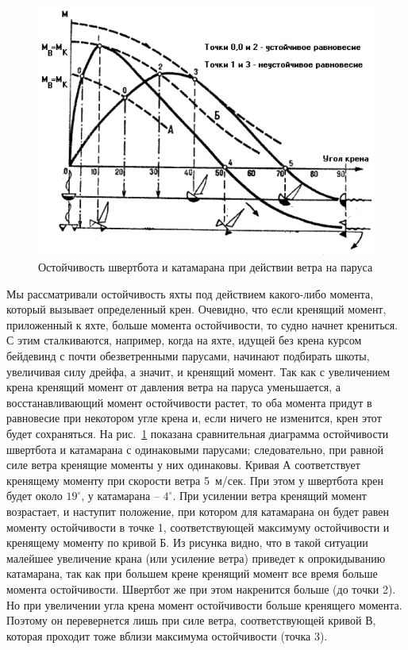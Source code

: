 \documentclass[a4paper, 12pt, twoside, final]{scrbook}
\begin{document}
\begin{figure}[htbp]
   \centering
   \includegraphics{pics/82_Ostojchevost_pri_vetre} %
   \caption{Остойчивость швертбота и катамарана при действии ветра на паруса}
   \label{fig:82}
\end{figure}

Мы рассматривали остойчивость яхты под действием какого-либо момента, который вызывает определенный крен. Очевидно, что если кренящий момент, приложенный к яхте, больше момента остойчивости, то судно начнет крениться. С этим сталкиваются, например, когда на яхте, идущей без крена курсом бейдевинд с почти обезветренными парусами, начинают подбирать шкоты, увеличивая силу дрейфа, а значит, и кренящий момент. Так как с увеличением крена кренящий момент от давления ветра на паруса уменьшается, а восстанавливающий момент остойчивости растет, то оба момента придут в равновесие при некотором угле крена и, если ничего не изменится, крен этот будет сохраняться. На рис.~\ref{fig:82} показана сравнительная диаграмма остойчивости швертбота и катамарана с одинаковыми парусами; следовательно, при равной силе ветра кренящие моменты у них одинаковы. Кривая А соответствует кренящему моменту при скорости ветра 5~м/сек. При этом у швертбота крен будет около $19^\circ$, у катамарана \--- $4^\circ$. При усилении ветра кренящий момент возрастает, и наступит положение, при котором для катамарана он будет равен моменту остойчивости в точке 1, соответствующей максимуму остойчивости и кренящему моменту по кривой Б. Из рисунка видно, что в такой ситуации малейшее увеличение крана (или усиление ветра) приведет к опрокидыванию катамарана, так как при большем крене кренящий момент все время больше момента остойчивости. Швертбот же при этом накренится больше (до точки 2). Но при увеличении угла крена момент остойчивости больше кренящего момента. Поэтому он перевернется лишь при силе ветра, соответствующей кривой В, которая проходит тоже вблизи максимума остойчивости (точка 3).
\end{document}
